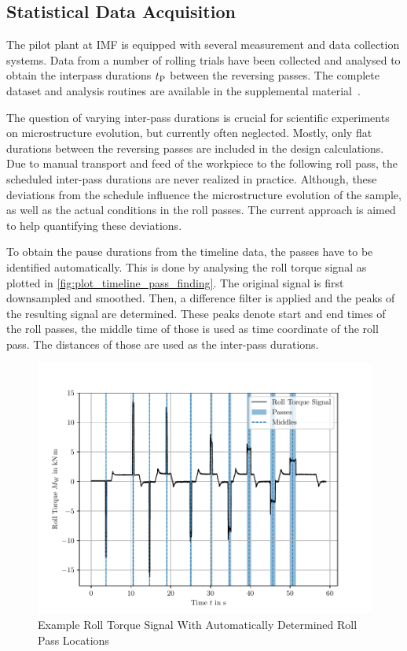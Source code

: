 \subsection{Statistical Data Acquisition}\label{subsec:data-acquisition}

The pilot plant at IMF is equipped with several measurement and data collection systems.
Data from a number of rolling trials have been collected and analysed to obtain the interpass durations ${t_\mathrm{P}}$ between the reversing passes.
The complete dataset and analysis routines are available in the supplemental material~\cite{WeinerVariationSupplemental2023}.

The question of varying inter-pass durations is crucial for scientific experiments on microstructure evolution, but currently often neglected.
Mostly, only flat durations between the reversing passes are included in the design calculations.
Due to manual transport and feed of the workpiece to the following roll pass, the scheduled inter-pass durations are never realized in practice.
Although, these deviations from the schedule influence the microstructure evolution of the sample, as well as the actual conditions in the roll passes.
The current approach is aimed to help quantifying these deviations.

To obtain the pause durations from the timeline data, the passes have to be identified automatically.
This is done by analysing the roll torque signal as plotted in \autoref{fig:plot_timeline_pass_finding}.
The original signal is first downsampled and smoothed.
Then, a difference filter is applied and the peaks of the resulting signal are determined.
These peaks denote start and end times of the roll passes, the middle time of those is used as time coordinate of the roll pass.
The distances of those are used as the inter-pass durations.

\begin{figure}
    \centering
    \includegraphics{img/plot_timeline_pass_finding}
    \caption{Example Roll Torque Signal With Automatically Determined Roll Pass Locations}
    \label{fig:plot_timeline_pass_finding}
\end{figure}


